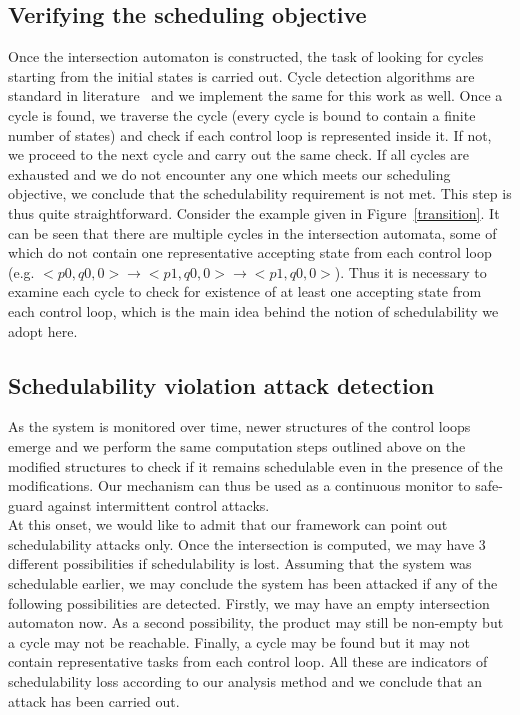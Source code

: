 \begin{figure}
\begin{center}
\end{center}
\label{fig:Algorithm}
\end{figure}

\subsection{Verifying the scheduling objective}
\noindent
Once the intersection automaton is constructed, the task of looking for cycles starting from the initial states is carried out.
Cycle detection algorithms are standard in literature~\cite{Clarke:2000:MC:332656} and we implement the same for this work as well. 
Once a cycle is found, we traverse the cycle (every cycle is bound to contain a finite number of states) and check if each control
loop is represented inside it. If not, we proceed to the next cycle and carry out the same check. If all cycles are exhausted and
we do not encounter any one which meets our scheduling objective, we conclude that the schedulability requirement is not met. 
This step is thus quite straightforward. Consider the example given in Figure~\ref{transition}. It can be seen that there are
multiple cycles in the intersection automata, some of which do not contain one representative accepting state from each control 
loop (e.g. $<p0,q0,0> \rightarrow <p1,q0,0> \rightarrow <p1,q0,0>$). Thus it is necessary to examine each cycle to check for
existence of at least one accepting state from each control loop, which is the main idea behind the notion of schedulability we adopt here. 

\subsection{Schedulability violation attack detection}
\noindent
As the system is monitored over time, newer structures of the control loops emerge and we perform the same computation steps
outlined above on the modified structures to check if it remains schedulable even in the presence of the modifications.
Our mechanism can thus be used as a continuous monitor to safe-guard against intermittent control attacks. \\

\noindent
At this onset, we would like to admit that our framework can point out schedulability attacks only. Once the intersection
is computed, we may have 3 different possibilities if schedulability is lost. Assuming that the system was schedulable earlier, 
we may conclude the system has been attacked if any of the following possibilities are detected. Firstly, we may have an empty 
intersection automaton now. As a second possibility, the product may still be non-empty but a cycle may not be reachable.
Finally, a cycle may be found but it may not contain representative tasks from each control loop. All these are indicators of 
schedulability loss according to our analysis method and we conclude that an attack has been carried out.